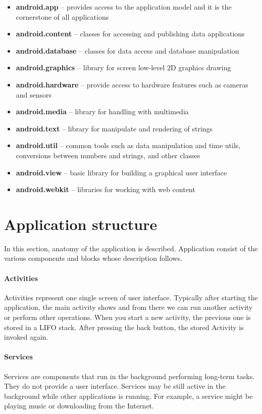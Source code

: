 \begin{itemize}
\item \textbf{android.app} -- provides access to the application model and it is the cornerstone of all applications
\item \textbf{android.content} -- classes for accessing and publishing data applications
\item \textbf{android.database} -- classes for data access and database manipulation 
\item \textbf{android.graphics} -- library for screen low-level 2D graphics drawing
\item \textbf{android.hardware} -- provide access to hardware features such as cameras and sensors
\item \textbf{android.media} -- library for handling with multimedia 
\item \textbf{android.text} -- library for manipulate and rendering of strings
\item \textbf{android.util} -- common tools such as data manipulation and time utils, conversions between numbers and strings, and other classes
\item \textbf{android.view} -- basic library for building a graphical user interface
\item \textbf{android.webkit} -- libraries for working with web content
\end{itemize}

\section{Application structure}\label{AppStructure}
In this section, anatomy of the application is described. Application consist of the various components and blocks whose description follows.

\paragraph{Activities}
Activities represent one single screen of user interface. Typically after starting the application, the main activity shows and from there we can run another activity or perform other operations. When you start a new activity, the previous one is stored in a LIFO stack. After pressing the back button, the stored Activity is invoked again.

\paragraph{Services}
Services are components that run in the background performing long-term tasks. They do not provide a user interface. Services may be still active in the background while other applications is running. For example, a service might be playing music or downloading from the Internet.

